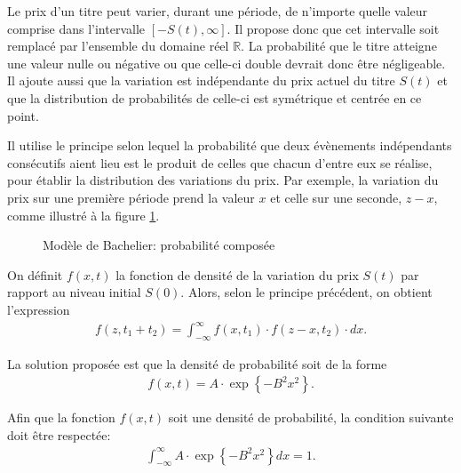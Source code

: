 Le prix d'un titre peut varier, durant une période, de n'importe
quelle valeur comprise dans l'intervalle $\left[ -S(t),\infty
\right]$. Il propose donc que cet intervalle soit remplacé par
l'ensemble du domaine réel $\mathbb{R}$. La probabilité que le titre
atteigne une valeur nulle ou négative ou que celle-ci double devrait
donc être négligeable. Il ajoute aussi que la variation est
indépendante du prix actuel du titre $S(t)$ et que la distribution de
probabilités de celle-ci est symétrique et centrée en ce point.

Il utilise le principe selon lequel la probabilité que deux évènements
indépendants consécutifs aient lieu est le produit de celles que
chacun d'entre eux se réalise, pour établir la distribution des
variations du prix. Par exemple, la variation du prix sur une première
période prend la valeur $x$ et celle sur une seconde, $z-x$, comme
illustré à la figure \ref{fig:bachelier1}.

\begin{figure}[!ht]
  \centering
  \caption{Modèle de Bachelier: probabilité composée}
  \label{fig:bachelier1}
\end{figure}

On définit $f(x,t)$ la fonction de densité de la variation du prix
$S(t)$ par rapport au niveau initial $S(0)$. Alors, selon le principe
précédent, on obtient l'expression
\begin{align}
  \label{eq:probcomposeeB}
  f(z,t_1+t_2) = \int_{-\infty}^{\infty} f(x,t_1)\cdot f(z-x,t_2)
  \cdot dx.
\end{align}

La solution proposée est que la densité de probabilité soit de la forme
\begin{align*}
  \label{eq:formeprobB}
  f(x,t) = A \cdot \exp \left\{-B^2x^2 \right\}.
\end{align*}

Afin que la fonction $f(x,t)$ soit une densité de probabilité, la
condition suivante doit être respectée:
\begin{align}
  \int_{-\infty}^{\infty} A \cdot \exp \left\{-B^2x^2 \right\} dx = 1.
\end{align}

